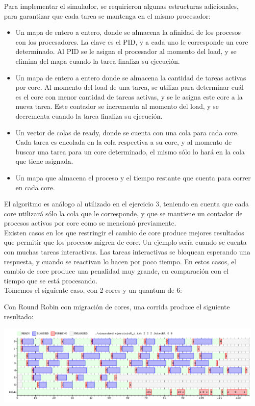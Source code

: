 Para implementar el simulador, se requirieron algunas estructuras adicionales, para garantizar que cada tarea se mantenga en el mismo procesador:
\begin{itemize}
	\item Un mapa de entero a entero, donde se almacena la afinidad de los procesos con los procesadores. La clave es el PID, y a cada uno le corresponde un core determinado. Al PID se le asigna el procesador al momento del load, y se elimina del mapa cuando la tarea finaliza su ejecución.
	\item Un mapa de entero a entero donde se almacena la cantidad de tareas activas por core. Al momento del load de una tarea, se utiliza para determinar cuál es el core con menor cantidad de tareas activas, y se le asigna este core a la nueva tarea. Este contador se incrementa al momento del load, y se decrementa cuando la tarea finaliza su ejecución.
	\item Un vector de colas de ready, donde se cuenta con una cola para cada core. Cada tarea es encolada en la cola respectiva a su core, y al momento de buscar una tarea para un core determinado, el mismo sólo lo hará en la cola que tiene asignada.
	\item Un mapa que almacena el proceso y el tiempo restante que cuenta para correr en cada core.
\end{itemize}

El algoritmo es análogo al utilizado en el ejercicio 3, teniendo en cuenta que cada core utilizará sólo la cola que le corresponde, y que se mantiene un contador de procesos activos por core como se mencionó previamente.\\

Existen casos en los que restringir el cambio de core produce mejores resultados que permitir que los procesos migren de core. Un ejemplo sería cuando se cuenta con muchas tareas interactivas. Las tareas interactivas se bloquean esperando una respuesta, y cuando se reactivan lo hacen por poco tiempo. En estos casos, el cambio de core produce una penalidad muy grande, en comparación con el tiempo que se está procesando.\\

\noindent
Tomemos el siguiente caso, con 2 cores y un quantum de 6:


Con Round Robin con migración de cores, una corrida produce el siguiente resultado: \\

\begin{center}
\includegraphics[scale=0.4]{graficos/ej8_RR_1.png}
\end{center}

